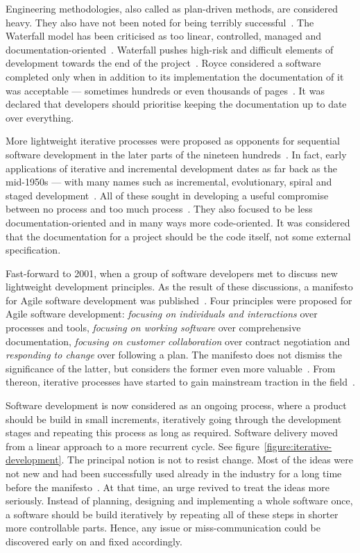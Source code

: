\documentclass[english]{tktltiki2}
\begin{document}
Engineering methodologies, also called as plan-driven methods, are considered heavy. They also have not been noted for being terribly successful~\cite{Fow05}. The Waterfall model has been criticised as too linear, controlled, managed and documentation-oriented~\cite{Boe88, LB03, Fow05}. Waterfall pushes high-risk and difficult elements of development towards the end of the project~\cite{VB09}. Royce considered a software completed only when in addition to its implementation the documentation of it was acceptable — sometimes hundreds or even thousands of pages~\cite{Roy70}. It was declared that developers should prioritise keeping the documentation up to date over everything.

More lightweight iterative processes were proposed as opponents for sequential software development in the later parts of the nineteen hundreds~\cite{LB03}. In fact, early applications of iterative and incremental development dates as far back as the mid-1950s — with many names such as incremental, evolutionary, spiral and staged development~\cite{Boe88, LB03, Fow05}. All of these sought in developing a useful compromise between no process and too much process~\cite{Fow05}. They also focused to be less documentation-oriented and in many ways more code-oriented. It was considered that the documentation for a project should be the code itself, not some external specification.

Fast-forward to 2001, when a group of software developers met to discuss new lightweight development principles. As the result of these discussions, a manifesto for Agile software development was published~\cite{BBB01a}. Four principles were proposed for Agile software development: \emph{focusing on individuals and interactions} over processes and tools, \emph{focusing on working software} over comprehensive documentation, \emph{focusing on customer collaboration} over contract negotiation and \emph{responding to change} over following a plan. The manifesto does not dismiss the significance of the latter, but considers the former even more valuable~\cite{BBB01a}. From thereon, iterative processes have started to gain mainstream traction in the field~\cite{LB03, Fow05}.

Software development is now considered as an ongoing process, where a product should be build in small increments, iteratively going through the development stages and repeating this process as long as required. Software delivery moved from a linear approach to a more recurrent cycle. See figure~\ref{figure:iterative-development}. The principal notion is not to resist change. Most of the ideas were not new and had been successfully used already in the industry for a long time before the manifesto~\cite{Fow05}. At that time, an urge revived to treat the ideas more seriously. Instead of planning, designing and implementing a whole software once, a software should be build iteratively by repeating all of these steps in shorter more controllable parts. Hence, any issue or miss-communication could be discovered early on and fixed accordingly.
\end{document}
